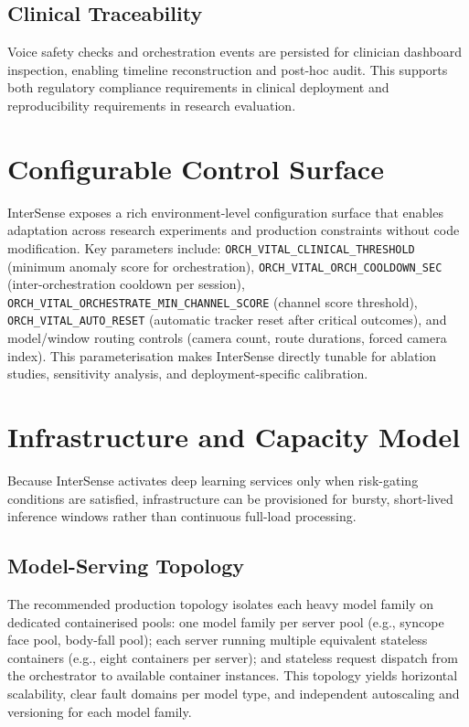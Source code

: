 \documentclass[10pt,twocolumn,a4paper]{article}
\begin{document}
\subsection{Clinical Traceability}

Voice safety checks and orchestration events are persisted for
clinician dashboard inspection, enabling timeline reconstruction and
post-hoc audit.  This supports both regulatory compliance requirements
in clinical deployment and reproducibility requirements in research
evaluation.

\section{Configurable Control Surface}

InterSense exposes a rich environment-level configuration surface that
enables adaptation across research experiments and production
constraints without code modification.  Key parameters include:
\texttt{ORCH\_VITAL\_CLINICAL\_THRESHOLD} (minimum anomaly score for
orchestration), \texttt{ORCH\_VITAL\_ORCH\_COOLDOWN\_SEC}
(inter-orchestration cooldown per session),
\texttt{ORCH\_VITAL\_ORCHESTRATE\_MIN\_CHANNEL\_SCORE} (channel score
threshold), \texttt{ORCH\_VITAL\_AUTO\_RESET} (automatic tracker reset
after critical outcomes), and model/window routing controls (camera
count, route durations, forced camera index).  This parameterisation
makes InterSense directly tunable for ablation studies, sensitivity
analysis, and deployment-specific calibration.

\section{Infrastructure and Capacity Model}

Because InterSense activates deep learning services only when
risk-gating conditions are satisfied, infrastructure can be
provisioned for bursty, short-lived inference windows rather than
continuous full-load processing.

\subsection{Model-Serving Topology}

The recommended production topology isolates each heavy model family on
dedicated containerised pools: one model family per server pool (e.g.,
syncope face pool, body-fall pool); each server running multiple
equivalent stateless containers (e.g., eight containers per server);
and stateless request dispatch from the orchestrator to available
container instances.  This topology yields horizontal scalability,
clear fault domains per model type, and independent autoscaling and
versioning for each model family.
\end{document}
